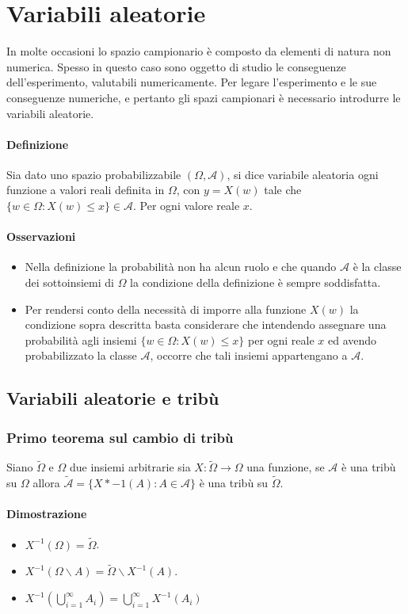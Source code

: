 \chapter{Variabili aleatorie}
In molte occasioni lo spazio campionario \`e composto da elementi di natura non numerica. Spesso in questo caso sono oggetto di studio le conseguenze dell'esperimento, 
valutabili numericamente. Per legare l'esperimento e le sue conseguenze numeriche, e pertanto gli spazi campionari \`e necessario introdurre le variabili aleatorie.
\subsubsection{Definizione}
Sia dato uno spazio probabilizzabile $(\Omega,\mathcal{A})$, si dice variabile aleatoria ogni funzione a valori reali definita in $\Omega$, con $y=X(w)$ tale che $\{w\in\Omega:
X(w)\le x\}\in\mathcal{A}$. Per ogni valore reale $x$.
\subsubsection{Osservazioni}
\begin{itemize}
\item Nella definizione la probabilit\`a non ha alcun ruolo e che quando $\mathcal{A}$ \`e la classe dei sottoinsiemi di $\Omega$ la condizione della definizione \`e sempre 
soddisfatta.
\item Per rendersi conto della necessit\`a di imporre alla funzione $X(w)$ la condizione sopra descritta basta considerare che intendendo assegnare una probabilit\`a agli 
insiemi $\{w\in\Omega:X(w)\le x\}$ per ogni reale $x$ ed avendo probabilizzato la classe $\mathcal{A}$, occorre che tali insiemi appartengano a $\mathcal{A}$.
\end{itemize}
\section{Variabili aleatorie e trib\`u}
\subsection{Primo teorema sul cambio di trib\`u}
Siano $\tilde{\Omega}$ e $\Omega$ due insiemi arbitrarie  sia $X:\tilde{\Omega}\rightarrow\Omega$ una funzione, se $\mathcal{A}$ \`e una trib\`u su $\Omega$ allora $
\tilde{\mathcal{A}}=\{X*{-1}(A):A\in\mathcal{A}\}$ \`e una trib\`u su $\tilde{\Omega}$.
\subsubsection{Dimostrazione}
\begin{itemize}
\item $X^{-1}(\Omega)=\tilde{\Omega}$.
\item $X^{-1}(\Omega\backslash A)=\tilde{\Omega}\backslash X^{-1}(A)$.
\item $X^{-1}(\bigcup\limits_{i=1}^\infty A_i)=\bigcup\limits_{i=1}^\infty X^{-1}(A_i)$
\end{itemize}

